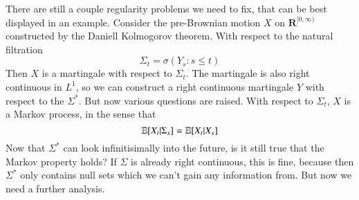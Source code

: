 There are still a couple regularity problems we need to fix, that can be best displayed in an example. Consider the pre-Brownian motion $X$ on $\mathbf{R}^{[0,\infty)}$ constructed by the Daniell Kolmogorov theorem. With respect to the natural filtration
%
\[ \Sigma_t = \sigma(Y_s: s \leq t) \]
%
Then $X$ is a martingale with respect to $\Sigma_t$. The martingale is also right continuous in $L^1$, so we can construct a right continuous martingale $Y$ with respect to the $\Sigma^*$. But now various questions are raised. With respect to $\Sigma_t$, $X$ is a Markov process, in the sense that
%
\[ \operatorname{\mathbb{E}}[X_t|\Sigma_s] = \operatorname{\mathbb{E}}[X_t|X_s] \]
%
Now that $\Sigma^*$ can look infinitisimally into the future, is it still true that the Markov property holds? If $\Sigma$ is already right continuous, this is fine, because then $\Sigma^*$ only contains null sets which we can't gain any information from. But now we need a further analysis.

